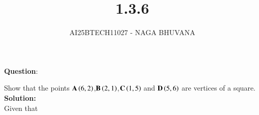 \documentclass[journal,12pt,onecolumn]{IEEEtran}
\begin{document}
\title{1.3.6}
\author{AI25BTECH11027 - NAGA BHUVANA}
{\let\newpage\relax\maketitle}

		\textbf{Question}:

		\noindent Show that the points $\textbf{A}\left(6,2\right)$,$\textbf{B}\left(2,1\right)$,$\textbf{C}\left(1,5\right)$ and $\textbf{D}\left(5,6\right)$ are vertices of a square.\\
		\textbf{Solution:}\\
      Given that
\end{document}
